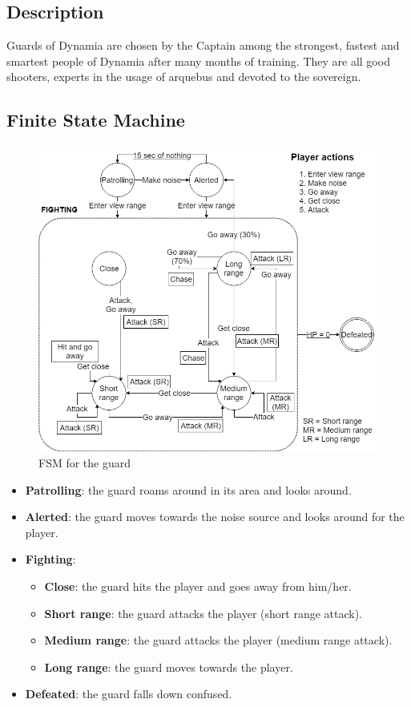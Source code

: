 \subsection{Description}
Guards of Dynamia are chosen by the Captain among the strongest, fastest and smartest people of Dynamia after many months of training. They are all good shooters, experts in the usage of arquebus and devoted to the sovereign.

\subsection{Finite State Machine}
\begin{figure}[H]
  \centering
  \includegraphics[width=\textwidth]{Images/Diagrams/FSMs/guardFSM}
  \caption{FSM for the guard}
\end{figure}

\begin{itemize}
	\item \textbf{Patrolling}: the guard roams around in its area and looks around.
	\item \textbf{Alerted}: the guard moves towards the noise source and looks around for the player.
	\item \textbf{Fighting}:
	\begin{itemize}
		\item \textbf{Close}: the guard hits the player and goes away from him/her.
		\item \textbf{Short range}: the guard attacks the player (short range attack).
		\item \textbf{Medium range}: the guard attacks the player (medium range attack).
		\item \textbf{Long range}: the guard moves towards the player.
	\end{itemize}
	\item \textbf{Defeated}: the guard falls down confused.
\end{itemize}


